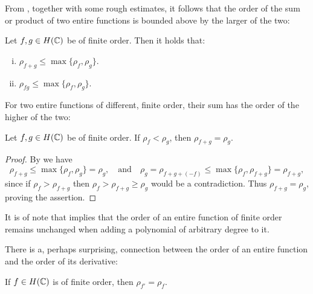 From , together with some rough estimates, it follows that the order of the sum or product of two entire functions is bounded above by the larger of the two:

\begin{proposition} \label{prop:order-sum-product-estimate}
    Let $f, g \in H(\mathbb{C})$ be of finite order. Then it holds that:
    \begin{enumerate}[i.]
        \item $\rho_{f + g} \leq \max \{ \rho_f, \rho_g \}$.
        \item $\rho_{fg} \leq \max \{ \rho_f, \rho_g \}$.
    \end{enumerate}
\end{proposition}

For two entire functions of different, finite order, their sum has the order of the higher of the two:

\begin{proposition} \label{prop:order-sum-equality}
    Let $f, g \in H(\mathbb{C})$ be of finite order. If $\rho_f < \rho_g$, then $\rho_{f + g} = \rho_g$.
\end{proposition}

\begin{proof}
    By  we have 
    \begin{equation*}
        \rho_{f+g} \leq \max \{ \rho_f, \rho_g \} = \rho_g, \quad\textrm{and}\quad \rho_g = \rho_{f+g+(-f)} \leq \max \{ \rho_f, \rho_{f+g} \} = \rho_{f+g},
    \end{equation*}
    since if $\rho_f > \rho_{f+g}$ then $\rho_f > \rho_{f+g} \geq \rho_g$ would be a contradiction. Thus $\rho_{f+g} = \rho_g$, proving the assertion.
\end{proof}

It is of note that  implies that the order of an entire function of finite order remains unchanged when adding a polynomial of arbitrary degree to it.

There is a, perhaps surprising, connection between the order of an entire function and the order of its derivative:

\begin{proposition} \label{prop:order-derivative}
    If $f \in H(\mathbb{C})$ is of finite order, then $\rho_{f'} = \rho_f$.
\end{proposition}

